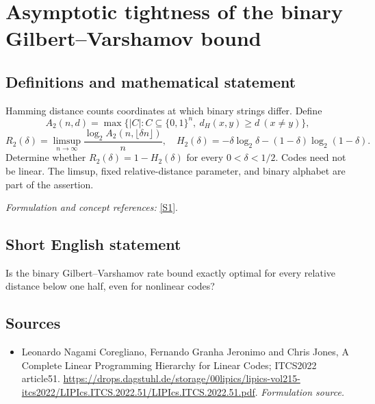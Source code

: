 \documentclass[11pt]{article}
\begin{document}
\section*{\texorpdfstring{Asymptotic tightness of the binary Gilbert–Varshamov bound}{Asymptotic tightness of the binary Gilbert–Varshamov bound}}\label{statement}
\subsection{Definitions and mathematical statement}
Hamming distance counts coordinates at which binary strings differ. Define
\[
 A_2(n,d)=\max\{|C|:C\subseteq\{0,1\}^n,\ d_H(x,y)\ge d\ (x\ne y)\},
\]
\[
 R_2(\delta)=\limsup_{n\to\infty}\frac{\log_2A_2(n,\lfloor\delta n\rfloor)}n,
 \quad H_2(\delta)=-\delta\log_2\delta-(1-\delta)\log_2(1-\delta).
\]
Determine whether $R_2(\delta)=1-H_2(\delta)$ for every $0<\delta<1/2$. Codes need not be linear. The limsup, fixed relative-distance parameter, and binary alphabet are part of the assertion.
\par\smallskip\textit{Formulation and concept references:} \href{https://drops.dagstuhl.de/storage/00lipics/lipics-vol215-itcs2022/LIPIcs.ITCS.2022.51/LIPIcs.ITCS.2022.51.pdf}{[S1]}.

\subsection{Short English statement}
Is the binary Gilbert--Varshamov rate bound exactly optimal for every relative distance below one half, even for nonlinear codes?
\subsection{Sources}
\begin{itemize}
\item[S1]Leonardo Nagami Coregliano, Fernando Granha Jeronimo and Chris Jones, A Complete Linear Programming Hierarchy for Linear Codes; ITCS2022 article51.
\url{https://drops.dagstuhl.de/storage/00lipics/lipics-vol215-itcs2022/LIPIcs.ITCS.2022.51/LIPIcs.ITCS.2022.51.pdf}.
\textit{Formulation source.}
\end{itemize}
\end{document}
